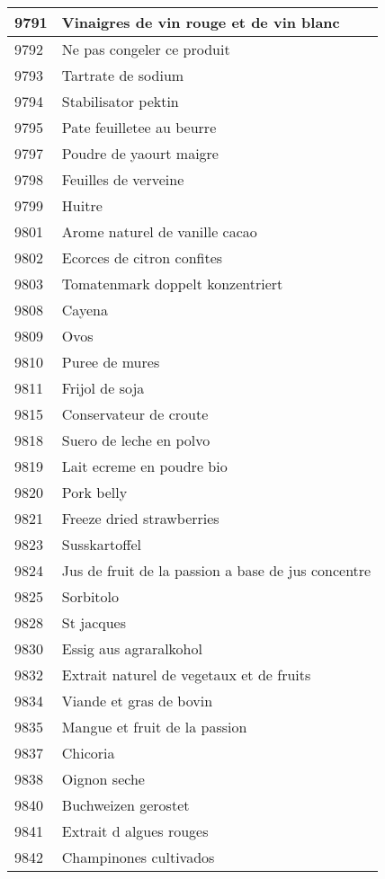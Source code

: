 \begin{longtable}{|l|l|}
9791 & Vinaigres de vin rouge et de vin blanc \\ \hline 
9792 & Ne pas congeler ce produit \\ \hline 
9793 & Tartrate de sodium \\ \hline 
9794 & Stabilisator pektin \\ \hline 
9795 & Pate feuilletee au beurre \\ \hline 
9797 & Poudre de yaourt maigre \\ \hline 
9798 & Feuilles de verveine \\ \hline 
9799 & Huitre \\ \hline 
9801 & Arome naturel de vanille cacao \\ \hline 
9802 & Ecorces de citron confites \\ \hline 
9803 & Tomatenmark doppelt konzentriert \\ \hline 
9808 & Cayena \\ \hline 
9809 & Ovos \\ \hline 
9810 & Puree de mures \\ \hline 
9811 & Frijol de soja \\ \hline 
9815 & Conservateur de croute \\ \hline 
9818 & Suero de leche en polvo \\ \hline 
9819 & Lait ecreme en poudre bio \\ \hline 
9820 & Pork belly \\ \hline 
9821 & Freeze dried strawberries \\ \hline 
9823 & Susskartoffel \\ \hline 
9824 & Jus de fruit de la passion a base de jus concentre \\ \hline 
9825 & Sorbitolo \\ \hline 
9828 & St jacques \\ \hline 
9830 & Essig aus agraralkohol \\ \hline 
9832 & Extrait naturel de vegetaux et de fruits \\ \hline 
9834 & Viande et gras de bovin \\ \hline 
9835 & Mangue et fruit de la passion \\ \hline 
9837 & Chicoria \\ \hline 
9838 & Oignon seche \\ \hline 
9840 & Buchweizen gerostet \\ \hline 
9841 & Extrait d algues rouges \\ \hline 
9842 & Champinones cultivados \\ \hline 

\end{longtable}
